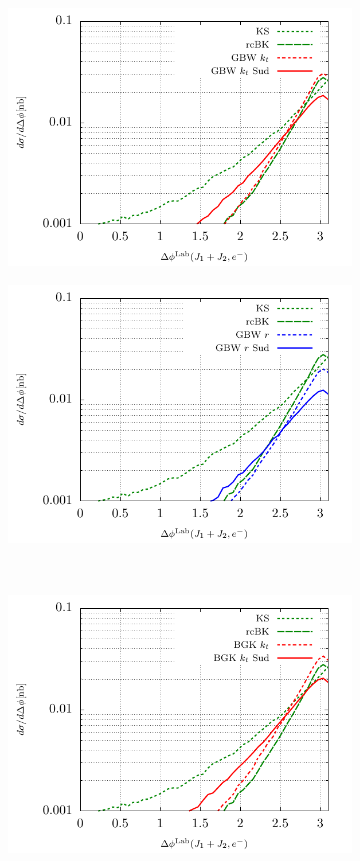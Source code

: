 \documentclass[11pt]{article}
\numberwithin{equation}{section}
\numberwithin{table}{section}
\numberwithin{figure}{section}
\begin{document}
\begin{figure}[p]
\begin{subfigure}{0.5\textwidth}
		\includegraphics[width=\textwidth]{plots/plotGBW2Lab}
	\end{subfigure}
	\begin{subfigure}{0.5\textwidth}
		\includegraphics[width=\textwidth]{plots/plotGBW3Lab}
	\end{subfigure}\\
	\begin{subfigure}{0.5\textwidth}
		\includegraphics[width=\textwidth]{plots/plotBGK2Lab}

\end{subfigure}
\end{figure}
\end{document}
